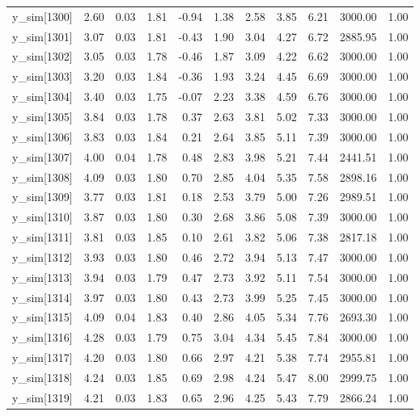 \begin{table}[ht]
\begin{tabular}{rrrrrrrrrrr}
  y\_sim[1300] & 2.60 & 0.03 & 1.81 & -0.94 & 1.38 & 2.58 & 3.85 & 6.21 & 3000.00 & 1.00 \\ 
  y\_sim[1301] & 3.07 & 0.03 & 1.81 & -0.43 & 1.90 & 3.04 & 4.27 & 6.72 & 2885.95 & 1.00 \\ 
  y\_sim[1302] & 3.05 & 0.03 & 1.78 & -0.46 & 1.87 & 3.09 & 4.22 & 6.62 & 3000.00 & 1.00 \\ 
  y\_sim[1303] & 3.20 & 0.03 & 1.84 & -0.36 & 1.93 & 3.24 & 4.45 & 6.69 & 3000.00 & 1.00 \\ 
  y\_sim[1304] & 3.40 & 0.03 & 1.75 & -0.07 & 2.23 & 3.38 & 4.59 & 6.76 & 3000.00 & 1.00 \\ 
  y\_sim[1305] & 3.84 & 0.03 & 1.78 & 0.37 & 2.63 & 3.81 & 5.02 & 7.33 & 3000.00 & 1.00 \\ 
  y\_sim[1306] & 3.83 & 0.03 & 1.84 & 0.21 & 2.64 & 3.85 & 5.11 & 7.39 & 3000.00 & 1.00 \\ 
  y\_sim[1307] & 4.00 & 0.04 & 1.78 & 0.48 & 2.83 & 3.98 & 5.21 & 7.44 & 2441.51 & 1.00 \\ 
  y\_sim[1308] & 4.09 & 0.03 & 1.80 & 0.70 & 2.85 & 4.04 & 5.35 & 7.58 & 2898.16 & 1.00 \\ 
  y\_sim[1309] & 3.77 & 0.03 & 1.81 & 0.18 & 2.53 & 3.79 & 5.00 & 7.26 & 2989.51 & 1.00 \\ 
  y\_sim[1310] & 3.87 & 0.03 & 1.80 & 0.30 & 2.68 & 3.86 & 5.08 & 7.39 & 3000.00 & 1.00 \\ 
  y\_sim[1311] & 3.81 & 0.03 & 1.85 & 0.10 & 2.61 & 3.82 & 5.06 & 7.38 & 2817.18 & 1.00 \\ 
  y\_sim[1312] & 3.93 & 0.03 & 1.80 & 0.46 & 2.72 & 3.94 & 5.13 & 7.47 & 3000.00 & 1.00 \\ 
  y\_sim[1313] & 3.94 & 0.03 & 1.79 & 0.47 & 2.73 & 3.92 & 5.11 & 7.54 & 3000.00 & 1.00 \\ 
  y\_sim[1314] & 3.97 & 0.03 & 1.80 & 0.43 & 2.73 & 3.99 & 5.25 & 7.45 & 3000.00 & 1.00 \\ 
  y\_sim[1315] & 4.09 & 0.04 & 1.83 & 0.40 & 2.86 & 4.05 & 5.34 & 7.76 & 2693.30 & 1.00 \\ 
  y\_sim[1316] & 4.28 & 0.03 & 1.79 & 0.75 & 3.04 & 4.34 & 5.45 & 7.84 & 3000.00 & 1.00 \\ 
  y\_sim[1317] & 4.20 & 0.03 & 1.80 & 0.66 & 2.97 & 4.21 & 5.38 & 7.74 & 2955.81 & 1.00 \\ 
  y\_sim[1318] & 4.24 & 0.03 & 1.85 & 0.69 & 2.98 & 4.24 & 5.47 & 8.00 & 2999.75 & 1.00 \\ 
  y\_sim[1319] & 4.21 & 0.03 & 1.83 & 0.65 & 2.96 & 4.25 & 5.43 & 7.79 & 2866.24 & 1.00 \\ 

\end{tabular}
\end{table}
